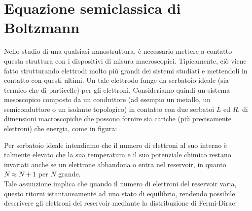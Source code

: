 \section{Equazione semiclassica di Boltzmann}
Nello studio di una qualsiasi nanostruttura, è necessario mettere a contatto questa struttura con i dispositivi di misura macroscopici. Tipicamente, ciò viene fatto strutturando elettrodi molto più grandi dei sistemi studiati e mettendoli in contatto con questi ultimi. Un tale elettrodo funge da serbatoio ideale (sia termico che di particelle) per gli elettroni. Consideriamo quindi un sistema mesoscopico composto da un conduttore (ad esempio un metallo, un semiconduttore o un isolante topologico) in contatto con due serbatoi $L$ ed $R$, di dimensioni macroscopiche che possono fornire sia cariche (più precisamente elettroni) che energia, come in figura:
\begin{figure}[H]
   \centering
\end{figure}
\hspace{-0.6cm}Per serbatoio ideale intendiamo che il numero di elettroni al suo interno è talmente elevato che la sua temperatura e il suo potenziale chimico restano invariati anche se un elettrone abbandona o entra nel reservoir, in quanto $N\approx N+1$ per $N$ grande.\\
Tale assunzione implica che quando il numero di elettroni del reservoir varia, questo ritorni istantaneamente ad uno stato di equilibrio, rendendo possibile descrivere gli elettroni dei reservoir mediante la distribuzione di Fermi-Dirac:
